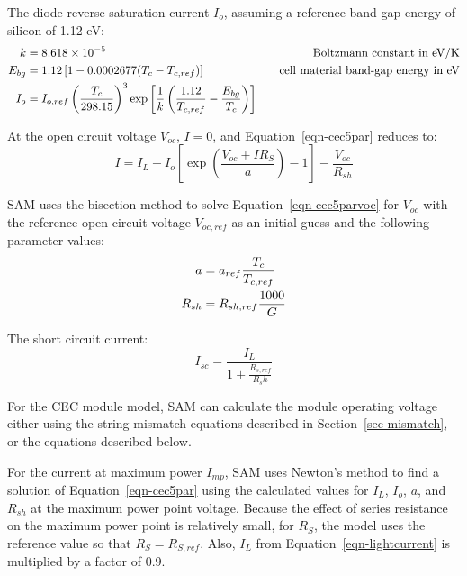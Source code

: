\documentclass[12pt,letterpaper]{article}
\begin{document}
The diode reverse saturation current $I_o$, assuming a reference band-gap energy of silicon of 1.12 eV:
\begin{align}
k &= 8.618 \times 10^{-5} &\quad\text{Boltzmann constant in eV/K} \notag\\
E_{bg} &= 1.12 \left[1-0.0002677(T_c-T_{c,ref})\right] &\quad\text{cell material band-gap energy in eV}\notag\\
I_o &= I_{o,ref} \left( \frac{T_c}{298.15} \right)^3 \exp\left[ \frac{1}{k} \left( \frac{1.12}{T_{c,ref}} - \frac{E_{bg}}{T_c} \right) \right] &
\end{align}

At the open circuit voltage $V_{oc}$, $I=0$, and Equation~\ref{eqn-cec5par} reduces to:
\begin{equation}\label{eqn-cec5parvoc}
I = I_L - I_o \left[ \exp\left(  \frac{V_{oc}+IR_S}{a} \right) -1 \right] - \frac{V_{oc}}{R_{sh}}
\end{equation}

SAM uses the bisection method to solve Equation~\ref{eqn-cec5parvoc} for $V_{oc}$ with the reference open circuit voltage $V_{oc,ref}$ as an initial guess and the following parameter values:
\begin{align} 
a &= a_{ref} \frac{T_c}{T_{c,ref}} \notag\\
R_{sh} &= R_{sh,ref} \frac{1000}{G}
\end{align}

The short circuit current:
\begin{equation} \label{eqn-cecisc}
I_{sc} = \frac{I_L }{1+\frac{R_{s,ref}}{R_sh}}
\end{equation}

For the CEC module model, SAM can calculate the module operating voltage either using the string mismatch equations described in Section~\ref{sec-mismatch}, or the equations described below.%


For the current at maximum power $I_{mp}$, SAM uses Newton's method to find a solution of Equation~\ref{eqn-cec5par} using the calculated values for $I_L$, $I_o$, $a$, and $R_{sh}$ at the maximum power point voltage. Because the effect of series resistance on the maximum power point is relatively small, for $R_S$, the model uses the reference value so that $R_S=R_{S,ref}$. Also, $I_L$ from Equation~\ref{eqn-lightcurrent} is multiplied by a factor of 0.9.
\end{document}
